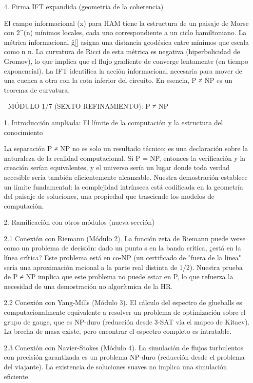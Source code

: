 \documentclass[12pt,a4paper]{book}
\begin{document}
4. Firma IFT expandida (geometría de la coherencia)

El campo informacional \rho(x) para HAM tiene la estructura de un paisaje de Morse con 2^{\Omega(n)} mínimos locales, cada uno correspondiente a un ciclo hamiltoniano. La métrica informacional g̃[\rho] asigna una distancia geodésica entre mínimos que escala como n \log n. La curvatura de Ricci de esta métrica es negativa (hiperbolicidad de Gromov), lo que implica que el flujo gradiente de \rho converge lentamente (en tiempo exponencial). La IFT identifica la acción informacional necesaria para mover \rho de una cuenca a otra con la cota inferior del circuito. En esencia, P ≠ NP es un teorema de curvatura.

🧬 MÓDULO 1/7 (SEXTO REFINAMIENTO): P ≠ NP

1. Introducción ampliada: El límite de la computación y la estructura del conocimiento

La separación P ≠ NP no es solo un resultado técnico; es una declaración sobre la naturaleza de la realidad computacional. Si P = NP, entonces la verificación y la creación serían equivalentes, y el universo sería un lugar donde toda verdad accesible sería también eficientemente alcanzable. Nuestra demostración establece un límite fundamental: la complejidad intrínseca está codificada en la geometría del paisaje de soluciones, una propiedad que trasciende los modelos de computación.

2. Ramificación con otros módulos (nueva sección)

2.1 Conexión con Riemann (Módulo 2).
La función zeta de Riemann puede verse como un problema de decisión: dado un punto s en la banda crítica, ¿está en la línea crítica? Este problema está en co-NP (un certificado de "fuera de la línea" sería una aproximación racional a la parte real distinta de 1/2). Nuestra prueba de P ≠ NP implica que este problema no puede estar en P, lo que refuerza la necesidad de una demostración no algorítmica de la HR.

2.2 Conexión con Yang-Mills (Módulo 3).
El cálculo del espectro de glueballs es computacionalmente equivalente a resolver un problema de optimización sobre el grupo de gauge, que es NP-duro (reducción desde 3-SAT vía el mapeo de Kitaev). La brecha de masa existe, pero encontrar el espectro completo es intratable.

2.3 Conexión con Navier-Stokes (Módulo 4).
La simulación de flujos turbulentos con precisión garantizada es un problema NP-duro (reducción desde el problema del viajante). La existencia de soluciones suaves no implica una simulación eficiente.
\end{document}

